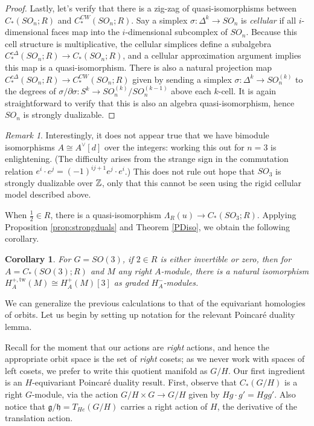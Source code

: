 \documentclass{memo-l}
\newtheorem{corollary}[theorem]{Corollary}
\theoremstyle{definition}
\theoremstyle{remark}
\newtheorem{remark}[theorem]{Remark}
\numberwithin{section}{chapter}
\numberwithin{equation}{chapter}
\begin{document}
\begin{proof}
Lastly, let's verify that there is a zig-zag of quasi-isomorphisms between $C_*(SO_n; R)$ and $C_*^{CW}(SO_n; R)$. Say a simplex $\sigma: \Delta^k \to SO_n$ is \emph{cellular} if all $i$-dimensional faces map into the $i$-dimensional subcomplex of $SO_n$. Because this cell structure is multiplicative, the cellular simplices define a subalgebra $C_*^{c\Delta}(SO_n; R) \to C_*(SO_n; R)$, and a cellular approximation argument implies this map is a quasi-isomorphism. There is also a natural projection map $C_*^{c\Delta}(SO_n;R) \to C_*^{CW}(SO_n; R)$ given by sending a simplex $\sigma: \Delta^k \to SO_n^{(k)}$ to the degrees of $\sigma/\partial \sigma: S^k \to SO_n^{(k)}/SO_n^{(k-1)}$ above each $k$-cell. It is again straightforward to verify that this is also an algebra quasi-isomorphism, hence $SO_n$ is strongly dualizable.
\end{proof}

\begin{remark}
Interestingly, it does not appear true that we have bimodule isomorphisms $A \cong A^\vee[d]$ over the integers: working this out for $n = 3$ is enlightening. (The difficulty arises from the strange sign in the commutation relation $e^i \cdot e^j = (-1)^{ij+1} e^j \cdot e^i$.) This does not rule out hope that $SO_3$ is strongly dualizable over $\Bbb Z$, only that this cannot be seen using the rigid cellular model described above. 
\end{remark}

When $\frac 12 \in R$, there is a quasi-isomorphism $\Lambda_R(u) \to C_*(SO_3; R)$. Applying Proposition \ref{prop:strongduals} and Theorem \ref{PDiso}, we obtain the following corollary.

\begin{corollary}\label{cor:iso-for-SO3}
For $G = SO(3)$, if $2 \in R$ is either invertible or zero, then for $A = C_*(SO(3); R)$ and $M$ any right $A$-module, there is a natural isomorphism $H^{+,\text{tw}}_A(M) \cong H^+_A(M)[3]$ as graded $H^-_A$-modules.
\end{corollary}

We can generalize the previous calculations to that of the equivariant homologies of orbits. Let us begin by setting up notation for the relevant Poincar\'e duality lemma. 

Recall for the moment that our actions are \emph{right} actions, and hence the appropriate orbit space is the set of \emph{right} cosets; as we never work with spaces of left cosets, we prefer to write this quotient manifold as $G/H$. Our first ingredient is an $H$-equivariant Poincar\'e duality result. First, observe that $C_*(G/H)$ is a right $G$-module, via the action $G/H \times G \to G/H$ given by $Hg \cdot g' = Hgg'$. Also notice that $\mathfrak g/\mathfrak h = T_{He}(G/H)$ carries a right action of $H$, the derivative of the translation action. 
\end{document}
